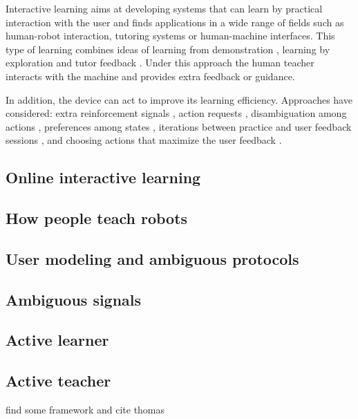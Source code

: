 Interactive learning \cite{nicolescu2003natural,breazeal2004tutelage} aims at developing systems that can learn by practical interaction with the user and finds applications in a wide range of fields such as human-robot interaction, tutoring systems or human-machine interfaces.
This type of learning combines ideas of learning from demonstration \cite{argall09survey}, learning by exploration \cite{thrun1992efficient} and tutor feedback \cite{kaplan2002robotic}. Under this approach the human teacher interacts with the machine and provides extra feedback or guidance. 

In addition, the device can act to improve its learning efficiency.
Approaches have considered: extra reinforcement signals \cite{thomaz2008teachable}, action requests \cite{lopes2009active}, disambiguation among actions \cite{chernova09jair}, preferences among states \cite{Mason2011}, iterations between practice and user feedback sessions \cite{judah2010reinforcement}, and choosing actions that maximize the user feedback \cite{knox2009interactively}. 

\subsection{Online interactive learning}

\subsection{How people teach robots}

\subsection{User modeling and ambiguous protocols}

\cite{macl11simul}

\subsection{Ambiguous signals}

\subsection{Active learner}

\subsection{Active teacher}


find some framework and cite thomas \cite{cederborg2013language}

